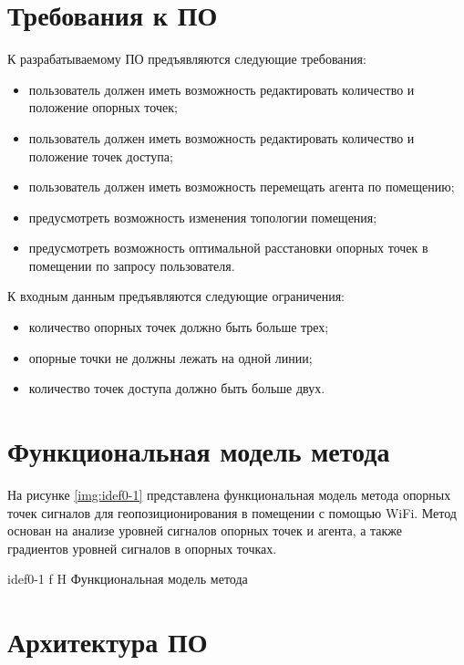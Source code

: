 \section{Требования к ПО}

К разрабатываемому ПО предъявляются следующие требования:

\begin{itemize}[label=---,left=0.49cm]
    \item пользователь должен иметь возможность редактировать количество и положение опорных точек;
    \item пользователь должен иметь возможность редактировать количество и положение точек доступа;
    \item пользователь должен иметь возможность перемещать агента по помещению;
    \item предусмотреть возможность изменения топологии помещения;
    \item предусмотреть возможность оптимальной расстановки опорных точек в помещении по запросу пользователя.
\end{itemize}

К входным данным предъявляются следующие ограничения:

\begin{itemize}[label=---,left=0.49cm]
    \item количество опорных точек должно быть больше трех;
    \item опорные точки не должны лежать на одной линии;
    \item количество точек доступа должно быть больше двух.
\end{itemize}

\section{Функциональная модель метода}

На рисунке \ref{img:idef0-1} представлена функциональная модель метода опорных точек сигналов для геопозиционирования в помещении с помощью WiFi. Метод основан на анализе уровней сигналов опорных точек и агента, а также градиентов уровней сигналов в опорных точках.

    {idef0-1}
    {f}
    {H}
    {\linewidth}
    {Функциональная модель метода}

\section{Архитектура ПО}


